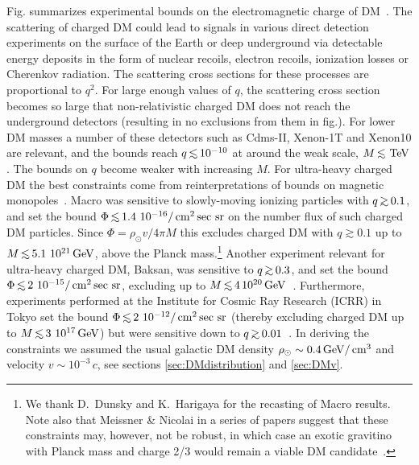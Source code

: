 Fig. summarizes experimental bounds on the electromagnetic charge of DM~\cite{CHAMP-exp}.
The scattering of charged DM could lead to signals in various direct detection experiments on the surface of the Earth or deep underground via detectable energy deposits in the form of nuclear recoils, electron recoils, ionization losses or Cherenkov radiation. The scattering cross sections for these processes are proportional to $q^2$. 
For large enough values of $q$, 
the scattering cross section becomes so large that non-relativistic charged DM does not reach the underground detectors (resulting in no exclusions from them in fig.). 
For lower DM masses a number of these detectors such as {\sc Cdms}-II, {\sc Xenon}-1T and {\sc Xenon}10 are relevant, and the bounds reach $q\circa{<} 10^{-10}$ at around the weak scale,  $M \circa{<}\TeV$.
The bounds on $q$ become weaker with increasing $M$. 
For ultra-heavy charged DM 
the best constraints come from reinterpretations of  bounds on magnetic monopoles~\cite{CHAMP-exp}.
{\sc Macro} was sensitive to slowly-moving ionizing particles with $q \circa{>}0.1$, and set the bound 
 $\Phi \circa{<}1.4~10^{-16}/\cm^2\sec\,{\rm sr}$ 
on the number flux of such charged DM particles.
Since $\Phi=\rho_\odot v/4\pi M$ this excludes charged DM with $q\gtrsim 0.1$ up to $M \circa{<}5.1~10^{21}\GeV$,
above the Planck mass.\footnote{We thank D.\ Dunsky and K.\ Harigaya for the recasting of {\sc Macro} results.
Note also  that Meissner \& Nicolai in a series of papers  suggest that 
these constraints may, however, not be robust, in which case an exotic gravitino
with  Planck mass and charge 2/3 would remain a viable DM candidate~\cite{SHchargedgravitino}.}
Another experiment relevant for ultra-heavy charged DM, {\sc Baksan}, 
was sensitive to $q \circa{>}0.3$, and set the bound $\Phi \circa{<}2~10^{-15}/\cm^2\sec\,{\rm sr}$, excluding up to $M \circa{<}4\,10^{20}\GeV$~\cite{CHAMP-exp}.
Furthermore, experiments performed at the Institute for Cosmic Ray Research (ICRR) in Tokyo set the bound $\Phi\circa{<}2~10^{-12}/\cm^2\sec\,{\rm sr}$ 
(thereby excluding charged DM up to $M\circa{<} 3~10^{17}\GeV$)
but were sensitive down to $q\circa{>}0.01$~\cite{CHAMP-exp}.
In deriving the constraints we assumed the usual galactic DM density $\rho_\odot \sim 0.4\,{\rm GeV}/\,{\rm cm}^3$
and velocity $v\sim 10^{-3} \, c$, see sections \ref{sec:DMdistribution} and \ref{sec:DMv}.



